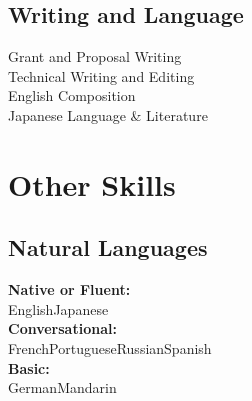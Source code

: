 \documentclass[letterpaper]{deedy-resume} %
\begin{document}
\begin{minipage}[t]{0.32\textwidth}
\sectionspace

\subsection{Writing and Language}
\textbullet{}Grant and Proposal Writing\\
\textbullet{}Technical Writing and Editing\\
\textbullet{}English Composition\\
\textbullet{}Japanese Language \& Literature

\section{Other Skills}
\sectionspace

\subsection{Natural Languages}
\sectionspace
\textbf{Native or Fluent:}\\English\textbullet{}Japanese\\
\textbf{Conversational:} \\French\textbullet{}Portuguese\textbullet{}Russian\textbullet{}Spanish\\
\textbf{Basic:}\\German\textbullet{}Mandarin

\sectionspace


\end{minipage}
\end{document}
